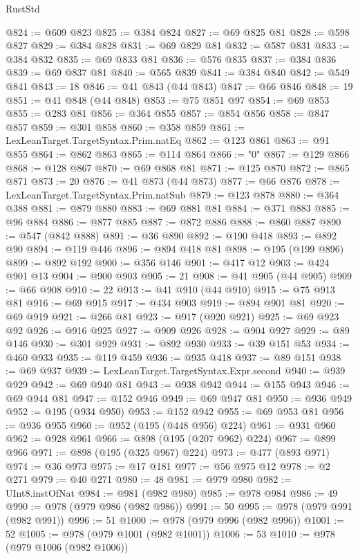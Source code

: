 \begin{lexlean}{RustStd}
\begin{coremodule}
@824 := @609 @823
@825 := @384 @824
@827 := @69 @825 @81
@828 := @598 @827
@829 := @384 @828
@831 := @69 @829 @81
@832 := @587 @831
@833 := @384 @832
@835 := @69 @833 @81
@836 := @576 @835
@837 := @384 @836
@839 := @69 @837 @81
@840 := @565 @839
@841 := @384 @840
@842 := @549 @841
@843 := 18
@846 := @41 @843 (@44 @843)
@847 := @66 @846
@848 := 19
@851 := @41 @848 (@44 @848)
@853 := @75 @851 @97
@854 := @69 @853
@855 := @283 @81
@856 := @364 @855
@857 := @854 @856
@858 := @847 @857
@859 := @301 @858
@860 := @358 @859
@861 := LexLeanTarget.TargetSyntax.Prim.natEq
@862 := @123 @861
@863 := @91 @855
@864 := @862 @863
@865 := @114 @864
@866 := "0"
@867 := @129 @866
@868 := @128 @867
@870 := @69 @868 @81
@871 := @125 @870
@872 := @865 @871
@873 := 20
@876 := @41 @873 (@44 @873)
@877 := @66 @876
@878 := LexLeanTarget.TargetSyntax.Prim.natSub
@879 := @123 @878
@880 := @364 @388
@881 := @879 @880
@883 := @69 @881 @81
@884 := @371 @883
@885 := @96 @884
@886 := @877 @885
@887 := @872 @886
@888 := @860 @887
@890 := @547 (@842 @888)
@891 := @36 @890
@892 := @190 @418
@893 := @892 @90
@894 := @119 @446
@896 := @894 @418 @81
@898 := @195 (@199 @896)
@899 := @892 @192
@900 := @356 @146
@901 := @417 @12
@903 := @424 @901 @13
@904 := @900 @903
@905 := 21
@908 := @41 @905 (@44 @905)
@909 := @66 @908
@910 := 22
@913 := @41 @910 (@44 @910)
@915 := @75 @913 @81
@916 := @69 @915
@917 := @434 @903
@919 := @894 @901 @81
@920 := @69 @919
@921 := @266 @81
@923 := @917 (@920 @921)
@925 := @69 @923 @92
@926 := @916 @925
@927 := @909 @926
@928 := @904 @927
@929 := @89 @146
@930 := @301 @929
@931 := @892 @930
@933 := @39 @151 @53
@934 := @460 @933
@935 := @119 @459
@936 := @935 @418
@937 := @89 @151
@938 := @69 @937
@939 := LexLeanTarget.TargetSyntax.Expr.second
@940 := @939 @929
@942 := @69 @940 @81
@943 := @938 @942
@944 := @155 @943
@946 := @69 @944 @81
@947 := @152 @946
@949 := @69 @947 @81
@950 := @936 @949
@952 := @195 (@934 @950)
@953 := @152 @942
@955 := @69 @953 @81
@956 := @936 @955
@960 := @952 (@195 (@448 @956) @224)
@961 := @931 @960
@962 := @928 @961
@966 := @898 (@195 (@207 @962) @224)
@967 := @899 @966
@971 := @898 (@195 (@325 @967) @224)
@973 := @477 (@893 @971)
@974 := @36 @973
@975 := @17 @181
@977 := @56 @975 @12
@978 := @2 @271
@979 := @40 @271
@980 := 48
@981 := @979 @980
@982 := UInt8.instOfNat
@984 := @981 (@982 @980)
@985 := @978 @984
@986 := 49
@990 := @978 (@979 @986 (@982 @986))
@991 := 50
@995 := @978 (@979 @991 (@982 @991))
@996 := 51
@1000 := @978 (@979 @996 (@982 @996))
@1001 := 52
@1005 := @978 (@979 @1001 (@982 @1001))
@1006 := 53
@1010 := @978 (@979 @1006 (@982 @1006))

\end{coremodule}
\end{lexlean}
